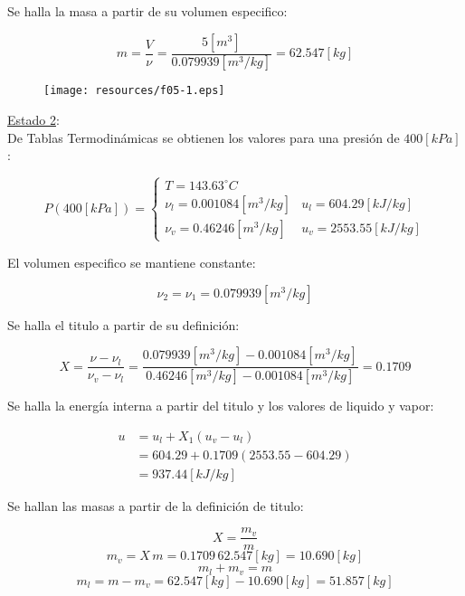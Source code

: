 \documentclass[letter,11pt]{article}
\begin{document}
\begin{enumerate}
Se halla la masa a partir de su volumen especifico:

\begin{equation*}
    m = \frac{V}{\nu} = \frac{5[m^3]}{0.079939[m^3/kg]}
      = 62.547[kg]
\end{equation*}

\begin{figure}[H]
\centering
\texttt{[image: resources/f05-1.eps]}
\end{figure}

\underline{Estado 2}: \\
De Tablas Termodinámicas se obtienen los valores para una presión de
$400[kPa]$:

\begin{equation*}
    P(400[kPa]) = \begin{cases}
        T = 143.63^\circ C\\
        \nu_l = 0.001084[m^3/kg] & u_l = 604.29[kJ/kg] \\
        \nu_v = 0.46246[m^3/kg]  & u_v = 2553.55[kJ/kg]
    \end{cases}
\end{equation*}

El volumen especifico se mantiene constante:

\begin{equation*}
    \nu_2 = \nu_1 = 0.079939[m^3/kg]
\end{equation*}

Se halla el titulo a partir de su definición:

\begin{equation*}
    X = \frac{\nu-\nu_l}{\nu_v-\nu_l}
      = \frac{0.079939[m^3/kg] - 0.001084[m^3/kg]}
      {0.46246[m^3/kg] - 0.001084[m^3/kg]}
      = 0.1709
\end{equation*}

Se halla la energía interna a partir del titulo y los valores de liquido y
vapor:

\begin{equation*}
    \begin{split}
        u &= u_l + X_1(u_v - u_l) \\
          &= 604.29 + 0.1709 (2553.55 - 604.29) \\
          &= 937.44[kJ/kg]
    \end{split}
\end{equation*}

Se hallan las masas a partir de la definición de titulo:

\begin{equation*}
    X = \frac{m_v}{m}
\end{equation*}
\begin{equation*}
    m_v = X\,m = 0.1709\,62.547[kg] = 10.690[kg]
\end{equation*}
\begin{equation*}
    m_l + m_v = m
\end{equation*}
\begin{equation*}
    m_l = m - m_v = 62.547[kg] - 10.690[kg] = 51.857[kg]
\end{equation*}


\end{enumerate}
\end{document}
